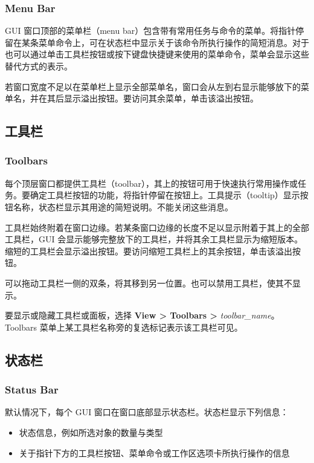\subsubsection*{Menu Bar}

GUI 窗口顶部的菜单栏（menu bar）包含带有常用任务与命令的菜单。将指针停留在某条菜单命令上，可在状态栏中显示关于该命令所执行操作的简短消息。对于也可以通过单击工具栏按钮或按下键盘快捷键来使用的菜单命令，菜单会显示这些替代方式的表示。

\begin{noteBox}
若窗口宽度不足以在菜单栏上显示全部菜单名，窗口会从左到右显示能够放下的菜单名，并在其后显示溢出按钮。要访问其余菜单，单击该溢出按钮。
\end{noteBox}

\subsection{工具栏}
\subsubsection*{Toolbars}

每个顶层窗口都提供工具栏（toolbar），其上的按钮可用于快速执行常用操作或任务。要确定工具栏按钮的功能，将指针停留在按钮上。工具提示（tooltip）显示按钮名称，状态栏显示其用途的简短说明。不能关闭这些消息。

工具栏始终附着在窗口边缘。若某条窗口边缘的长度不足以显示附着于其上的全部工具栏，GUI 会显示能够完整放下的工具栏，并将其余工具栏显示为缩短版本。缩短的工具栏会显示溢出按钮。要访问缩短工具栏上的其余按钮，单击该溢出按钮。

可以拖动工具栏一侧的双条，将其移到另一位置。也可以禁用工具栏，使其不显示。

要显示或隐藏工具栏或面板，选择 \textbf{View > Toolbars >} \textit{toolbar\_name}。Toolbars 菜单上某工具栏名称旁的复选标记表示该工具栏可见。

\subsection{状态栏}
\subsubsection*{Status Bar}

默认情况下，每个 GUI 窗口在窗口底部显示状态栏。状态栏显示下列信息：
\begin{itemize}
  \item 状态信息，例如所选对象的数量与类型
  \item 关于指针下方的工具栏按钮、菜单命令或工作区选项卡所执行操作的信息
\end{itemize}

